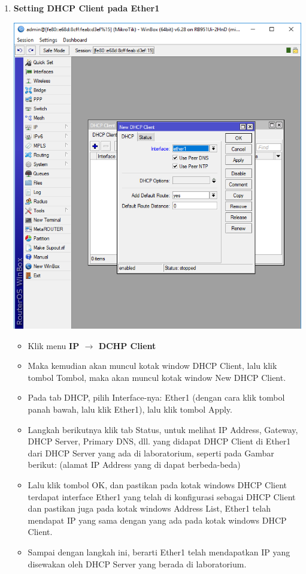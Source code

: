 \documentclass[a4paper,12pt]{article}
\begin{document}
\begin{enumerate}[label=\textbf{\arabic*.}]
    \item \textbf{Setting DHCP Client pada Ether1\\}
        \begin{center}
            \includegraphics[scale=0.5]{image3.png}
        \end{center}
        \begin{itemize}
            \item Klik menu \textbf{IP $\rightarrow$ DCHP Client}
            \item Maka kemudian akan muncul kotak window DHCP Client, lalu klik tombol Tombol, maka akan muncul kotak window New DHCP Client.
            \item Pada tab DHCP, pilih Interface-nya: Ether1 (dengan cara klik tombol panah bawah, lalu klik Ether1), lalu klik tombol Apply.
            \item Langkah berikutnya klik tab Status, untuk melihat IP Address, Gateway, DHCP Server, Primary DNS, dll. yang didapat DHCP Client di Ether1 dari DHCP Server yang ada di laboratorium, seperti pada Gambar berikut: (alamat IP Address yang di dapat berbeda-beda)
            \item Lalu klik tombol OK, dan pastikan pada kotak windows DHCP Client terdapat interface Ether1 yang telah di konfigurasi sebagai DHCP Client dan pastikan juga pada kotak windows Address List, Ether1 telah mendapat IP yang sama dengan yang ada pada kotak windows DHCP Client.
            \item Sampai dengan langkah ini, berarti Ether1 telah mendapatkan IP yang disewakan oleh DHCP Server yang berada di laboratorium.
        \end{itemize}


\end{enumerate}
\end{document}
